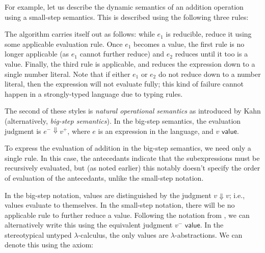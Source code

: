For example, let us describe the dynamic semantics of an addition operation using a small-step semantics. This is described using the following three rules:

\begin{singlespace}
\end{singlespace}

The algorithm carries itself out as follows: while $e_1$ is reducible, reduce it using some applicable evaluation rule. Once $e_1$ becomes a value, the first rule is no longer applicable (as $e_1$ cannot further reduce) and $e_2$ reduces until it too is a value. Finally, the third rule is applicable, and reduces the expression down to a single number literal. Note that if either $e_1$ or $e_2$ do not reduce down to a number literal, then the expression will not evaluate fully; this kind of failure cannot happen in a strongly-typed language due to typing rules.

The second of these styles is \textit{natural operational semantics} as introduced by Kahn \cite{Kahn1987NaturalS} (alternatively, \textit{big-step semantics}). In the big-step semantics, the evaluation judgment is $e^-\Downarrow v^+$, where $e$ is an expression in the language, and $v\textsf{ value}$.

To express the evaluation of addition in the big-step semantics, we need only a single rule. In this case, the antecedants indicate that the subexpressions must be recursively evaluated, but (as noted earlier) this notably doesn't specify the order of evaluation of the antecedants, unlike the small-step notation.

\begin{singlespace}
  \begin{mathpar}
  \end{mathpar}
\end{singlespace}

In the big-step notation, values are distinguished by the judgment $v\Downarrow v$; i.e., values evaluate to themselves. In the small-step notation, there will be no applicable rule to further reduce a value. Following the notation from \cite{conf/popl/Hazelnut17,conf/popl/HazelnutLive19}, we can alternatively write this using the equivalent judgment $v^-\textsf{ value}$. In the stereotypical untyped $\lambda$-calculus, the only values are $\lambda$-abstractions. We can denote this using the axiom:

